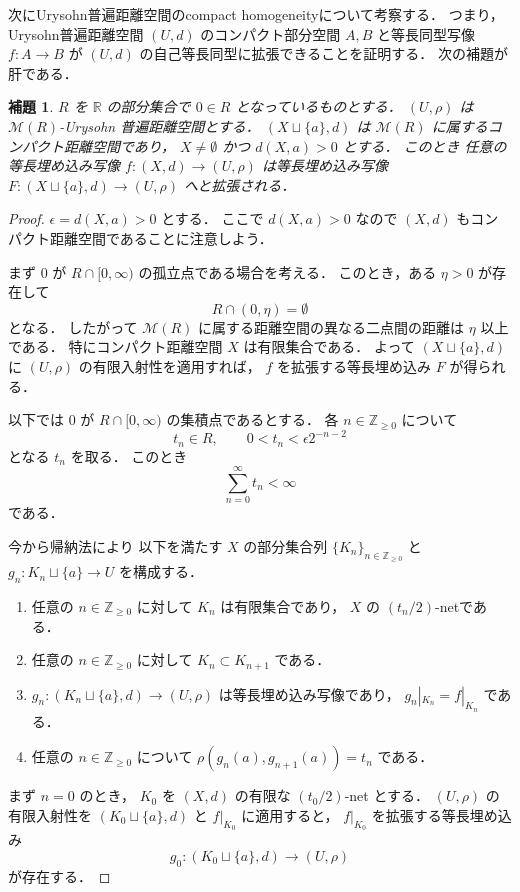\documentclass[leqno, 12pt]{jsarticle}
\newtheorem{lem}[thm]{補題}
\newcommand{\zz}{\mathbb{Z}}
\newcommand{\yozz}[1]{\zz_{\ge #1}}
\newcommand{\rr}{\mathbb{R}}
\newcommand{\SetPointDist}[3]{#1(#2,#3)}
\newcommand{\Met}[1]{\mathscr{M}(#1)}
\newcommand{\restr}[2]{#1|_{#2}}
\begin{document}
次にUrysohn普遍距離空間のcompact homogeneityについて考察する．
つまり，%
Urysohn普遍距離空間
$(U, d)$
のコンパクト部分空間
$A, B$
と等長同型写像
$f\colon  A\to B$
が
$(U, d)$
の自己等長同型に拡張できることを証明する．
次の補題が肝である．
\begin{lem}\label{lem:pp:cpthom}
$R$
を
$\rr$
の部分集合で
$0\in R$
となっているものとする．
$(U, \rho)$
は
$\Met{R}$-Urysohn
普遍距離空間とする．
$(X\sqcup\{a\}, d)$
は
$\Met{R}$
に属するコンパクト距離空間であり，
$X\neq\emptyset$
かつ
$\SetPointDist{d}{X}{a}>0$
とする．
このとき
任意の等長埋め込み写像
$f\colon  (X, d)\to(U, \rho)$
は等長埋め込み写像
$F\colon  (X\sqcup \{a\}, d)\to (U, \rho)$
へと拡張される．
\end{lem}
\begin{proof}
$\epsilon =\SetPointDist{d}{X}{a}>0$%
とする．
ここで
$\SetPointDist{d}{X}{a}>0$
なので
$(X, d)$
もコンパクト距離空間であることに注意しよう．

まず
$0$
が
$R\cap[0,\infty)$
の孤立点である場合を考える．
このとき，ある
$\eta>0$
が存在して
\[
R\cap(0,\eta)=\emptyset
\]
となる．
したがって
$\Met{R}$
に属する距離空間の異なる二点間の距離は
$\eta$
以上である．
特にコンパクト距離空間
$X$
は有限集合である．
よって
$(X\sqcup\{a\},d)$
に
$(U,\rho)$
の有限入射性を適用すれば，
$f$
を拡張する等長埋め込み
$F$
が得られる．

以下では
$0$
が
$R\cap[0,\infty)$
の集積点であるとする．
各
$n\in\yozz{0}$
について
\[
t_n\in R,
\qquad
0<t_n<\epsilon 2^{-n-2}
\]
となる
$t_n$
を取る．
このとき
\[
\sum_{n=0}^{\infty}t_n<\infty
\]
である．



今から帰納法により
以下を満たす
$X$
の部分集合列
$\{K_{n}\}_{n\in \yozz{0}}$
と
$g_{n}\colon  K_{n}\sqcup\{a\}\to U$%
を構成する．
\begin{enumerate}[label=\textup{(\arabic*)}]
\item
任意の
$n\in \yozz{0}$
に対して
$K_{n}$
は有限集合であり，
$X$
の
$(t_n/2)$-netである．
\item
任意の
$n\in \yozz{0}$
に対して
$K_{n}\subset K_{n+1}$%
である．
\item
$g_{n}\colon  (K_{n}\sqcup\{a\}, d)\to (U, \rho)$
は等長埋め込み写像であり，
$\restr{g_{n}}{K_n}=\restr{f}{K_{n}}$%
である．
\item
任意の
$n\in \yozz{0}$
について
$\rho(g_{n}(a), g_{n+1}(a))=t_n$
である．
\end{enumerate}
まず
$n=0$
のとき，
$K_{0}$
を
$(X, d)$
の有限な
$(t_0/2)$-net
とする．
$(U, \rho)$
の有限入射性を
$(K_0\sqcup\{a\},d)$
と
$\restr{f}{K_0}$
に適用すると，
$\restr{f}{K_0}$
を拡張する等長埋め込み
\[
g_0\colon (K_0\sqcup\{a\},d)\to(U,\rho)
\]
が存在する．


\end{proof}
\end{document}
